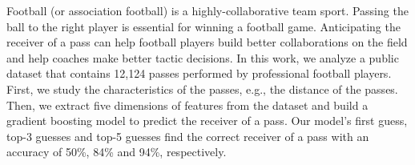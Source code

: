 Football (or association football) is a highly-collaborative team sport. 
Passing the ball to the right player is essential for winning a football game.
Anticipating the receiver of a pass can help football players build better collaborations on the field and help coaches make better tactic decisions.
In this work, we analyze a public dataset that contains 12,124 passes performed by professional football players.
First, we study the characteristics of the passes, e.g., the distance of the passes.
Then, we extract five dimensions of features from the dataset and build a gradient boosting model to predict the receiver of a pass. 
Our model's first guess, top-3 guesses and top-5 guesses find the correct receiver of a pass with an accuracy of 50\%, 84\% and 94\%, respectively.
